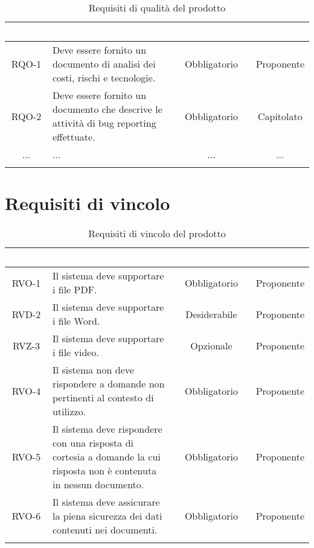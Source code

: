 \begingroup
\setlength{\tabcolsep}{10pt}
\renewcommand{\arraystretch}{1.5}
\begin{xltabular}{\textwidth}{| c | X | c | c |}
    \hline
     \textbf{\textcolor{white}{Codice}} & \textbf{\textcolor{white}{Descrizione}} & \textbf{\textcolor{white}{Classificazione}} & \textbf{\textcolor{white}{Fonte}}\\
    \hline
    \endhead
    RQO-1 & Deve essere fornito un documento di analisi dei costi, rischi e tecnologie. & Obbligatorio & Proponente \\
    \hline
    RQO-2 & Deve essere fornito un documento che descrive le attività di bug reporting effettuate. & Obbligatorio & Capitolato \\
    \hline
    ... & ... & ... & ... \\
    \hline
     \caption{Requisiti di qualità del prodotto}
    \label{tab:reqqua}
\end{xltabular}
\endgroup

\section{Requisiti di vincolo}

\begingroup
\setlength{\tabcolsep}{10pt}
\renewcommand{\arraystretch}{1.5}
\begin{xltabular}{\textwidth}{| c | X | c | c |}
    \hline
     \textbf{\textcolor{white}{Codice}} & \textbf{\textcolor{white}{Descrizione}} & \textbf{\textcolor{white}{Classificazione}} & \textbf{\textcolor{white}{Fonte}}\\
    \hline
    \endhead
    RVO-1 & Il sistema deve supportare i file PDF. & Obbligatorio & Proponente \\
    \hline
    RVD-2 & Il sistema deve supportare i file Word. & Desiderabile & Proponente \\
    \hline
    RVZ-3 & Il sistema deve supportare i file video. & Opzionale & Proponente \\
    \hline
    RVO-4 & Il sistema non deve rispondere a domande non pertinenti al contesto di utilizzo. & Obbligatorio & Proponente \\
    \hline
    RVO-5 & Il sistema deve rispondere con una risposta di cortesia a domande la cui risposta non è contenuta in nessun documento. & Obbligatorio & Proponente \\
    \hline
    RVO-6 & Il sistema deve assicurare la piena sicurezza dei dati contenuti nei documenti. & Obbligatorio & Proponente \\
    \hline
     \caption{Requisiti di vincolo del prodotto}
    \label{tab:reqvin}
\end{xltabular}
\endgroup

